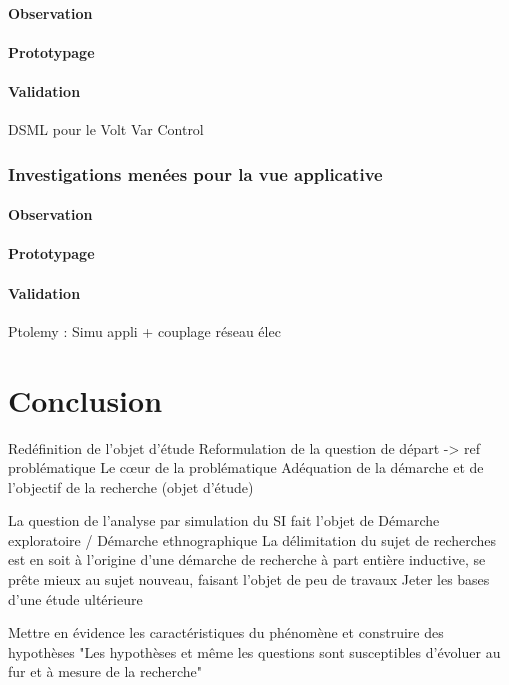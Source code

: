 {		\paragraph{Observation}
		
		\paragraph{Prototypage}
		
		\paragraph{Validation}
	DSML pour le Volt Var Control
	\subsubsection{Investigations menées pour la vue applicative} 
		\paragraph{Observation}
		
		\paragraph{Prototypage}
		
		\paragraph{Validation}
	Ptolemy : Simu appli + couplage réseau élec
	
	
\section{Conclusion}
Redéfinition de l'objet d'étude
Reformulation de la question de départ -> ref problématique 
Le cœur de la problématique 
Adéquation de la démarche et de l'objectif de la recherche (objet d'étude)
	
La question de l'analyse par simulation du SI fait l'objet de 
Démarche exploratoire / Démarche ethnographique 
La délimitation du sujet de recherches est en soit à l'origine d'une démarche de 
recherche à part entière  inductive, se prête mieux au sujet nouveau, faisant 
l'objet de peu de travaux
Jeter les bases d'une étude ultérieure


Mettre en évidence les caractéristiques du phénomène et construire des 
hypothèses 
"Les hypothèses et même les questions sont susceptibles d'évoluer au fur et à 
mesure de la recherche"

}
